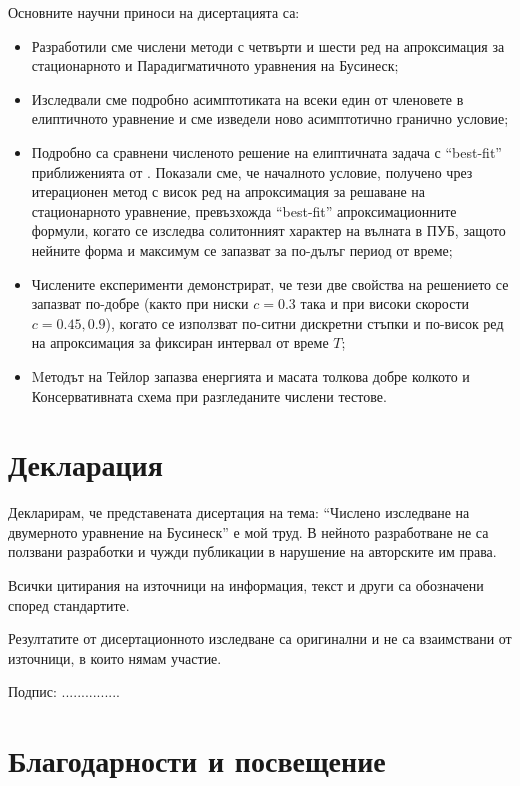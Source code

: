 \documentclass[a4paper]{article}
\theoremstyle{remark}
\begin{document}
\begin{large}
Основните научни приноси на дисертацията са:
\begin{itemize}
  \item Разработили сме числени методи с четвърти и шести ред на апроксимация за стационарното и Парадигматичното уравнения на Бусинеск;
  \item Изследвали сме подробно асимптотиката на всеки един от членовете в елиптичното уравнение и сме изведели ново асимптотично гранично условие;
  \item Подробно са сравнени численото решение на елиптичната задача с ``best-fit'' приближенията от \cite{ref15}. Показали сме, че началното условие, получено чрез итерационен метод с висок ред на апроксимация за решаване на стационарното уравнение, превъзхожда ``best-fit'' апроксимационните формули, когато се изследва солитонният характер на вълната в ПУБ, защото нейните форма и максимум се запазват за по-дълъг период от време;
  \item Числените експерименти демонстрират, че тези две свойства на решението се запазват по-добре (както при ниски $c=0.3$ така и при високи скорости $c=0.45,0.9$), когато се използват по-ситни дискретни стъпки и по-висок ред на апроксимация за фиксиран интервал от време $T$;
  \item Mетодът на Тейлор запазва енергията и масата толкова добре колкото и Консервативната схема при разгледаните числени тестове.
\end{itemize}

\section{Декларация}
Декларирам, че представената дисертация на тема: ``Числено изследване на двумерното уравнение на Бусинеск'' е мой труд. В нейното разработване не са ползвани разработки и чужди публикации в нарушение на авторските им права. 

Всички цитирания на източници на информация, текст и други са обозначени според стандартите.

Резултатите от дисертационното изследване са оригинални и не са взаимствани от източници, в които нямам участие.
\vspace{1cm}

Подпис: ...............

\newpage
\section{Благодарности и посвещение}


\end{large}
\end{document}
